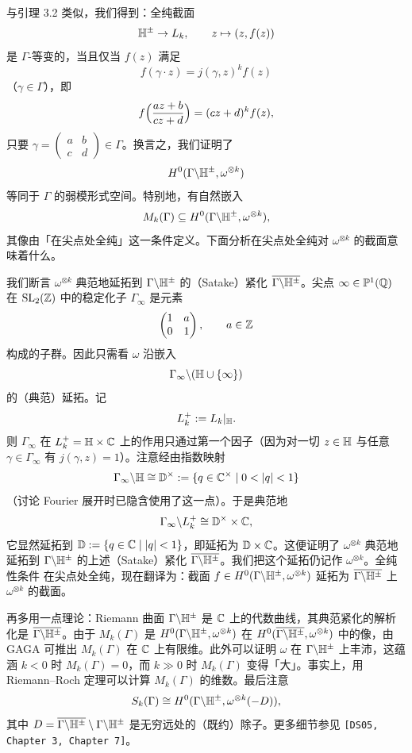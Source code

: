 与引理 3.2 类似，我们得到：全纯截面
\[
\mathbb{H}^\pm\to L_k,\qquad z\mapsto(z,f(z))
\]
是 $\Gamma$-等变的，当且仅当 $f(z)$ 满足
\[
f(\gamma\cdot z)=j(\gamma,z)^kf(z)
\]
（$\gamma\in\Gamma$），即
\[
f\Bigl(\frac{az+b}{cz+d}\Bigr)=(cz+d)^kf(z),
\]
只要 $\gamma=\begin{pmatrix}a&b\\c&d\end{pmatrix}\in\Gamma$。换言之，我们证明了
\[
H^0(\Gamma\backslash\mathbb{H}^\pm,\omega^{\otimes k})
\]
等同于 $\Gamma$ 的弱模形式空间。特别地，有自然嵌入
\[
M_k(\Gamma)\subseteq H^0(\Gamma\backslash\mathbb{H}^\pm,\omega^{\otimes k}),
\]
其像由「在尖点处全纯」这一条件定义。下面分析在尖点处全纯对 $\omega^{\otimes k}$ 的截面意味着什么。

我们断言 $\omega^{\otimes k}$ 典范地延拓到 $\Gamma\backslash\mathbb{H}^\pm$ 的（Satake）紧化 $\overline{\Gamma\backslash\mathbb{H}^\pm}$。尖点 $\infty\in\mathbb{P}^1(\mathbb{Q})$ 在 $\operatorname{SL}_2(\mathbb{Z})$ 中的稳定化子 $\Gamma_\infty$ 是元素
\[
\begin{pmatrix}1&a\\0&1\end{pmatrix},\qquad a\in\mathbb{Z}
\]
构成的子群。因此只需看 $\omega$ 沿嵌入
\[
\Gamma_\infty\backslash(\mathbb{H}\cup\{\infty\})
\]
的（典范）延拓。记
\[
L_k^+:=L_k|_{\mathbb{H}}.
\]
则 $\Gamma_\infty$ 在 $L_k^+=\mathbb{H}\times\mathbb{C}$ 上的作用只通过第一个因子（因为对一切 $z\in\mathbb{H}$ 与任意 $\gamma\in\Gamma_\infty$ 有 $j(\gamma,z)=1$）。注意经由指数映射
\[
\Gamma_\infty\backslash\HH\cong\mathbb{D}^\times:=\{q\in\C^\times\mid 0<|q|<1\}
\]
（讨论 Fourier 展开时已隐含使用了这一点）。于是典范地
\[
\Gamma_\infty\backslash L_k^+\cong\mathbb{D}^\times\times\mathbb{C},
\]
它显然延拓到 $\mathbb{D}:=\{q\in\mathbb{C}\mid|q|<1\}$，即延拓为 $\mathbb{D}\times\mathbb{C}$。这便证明了 $\omega^{\otimes k}$ 典范地延拓到 $\Gamma\backslash\mathbb{H}^\pm$ 的上述（Satake）紧化 $\overline{\Gamma\backslash\mathbb{H}^\pm}$。我们把这个延拓仍记作 $\omega^{\otimes k}$。全纯性条件
在尖点处全纯，现在翻译为：截面 $f\in H^0(\Gamma\backslash\mathbb{H}^\pm,\omega^{\otimes k})$ 延拓为 $\overline{\Gamma\backslash\mathbb{H}^\pm}$ 上 $\omega^{\otimes k}$ 的截面。

再多用一点理论：Riemann 曲面 $\Gamma\backslash\mathbb{H}^\pm$ 是 $\mathbb{C}$ 上的代数曲线，其典范紧化的解析化是 $\overline{\Gamma\backslash\mathbb{H}^\pm}$。由于 $M_k(\Gamma)$ 是 $H^0(\Gamma\backslash\mathbb{H}^\pm,\omega^{\otimes k})$ 在 $H^0(\overline{\Gamma\backslash\mathbb{H}^\pm},\omega^{\otimes k})$ 中的像，由 GAGA 可推出 $M_k(\Gamma)$ 在 $\mathbb{C}$ 上有限维。此外可以证明 $\omega$ 在 $\Gamma\backslash\mathbb{H}^\pm$ 上丰沛，这蕴涵 $k<0$ 时 $M_k(\Gamma)=0$，而 $k\gg0$ 时 $M_k(\Gamma)$ 变得「大」。事实上，用 Riemann--Roch 定理可以计算 $M_k(\Gamma)$ 的维数。最后注意
\[
S_k(\Gamma)\cong H^0(\Gamma\backslash\mathbb{H}^\pm,\omega^{\otimes k}(-D)),
\]
其中 $D=\overline{\Gamma\backslash\mathbb{H}^\pm}\setminus\Gamma\backslash\mathbb{H}^\pm$ 是无穷远处的（既约）除子。更多细节参见 \texttt{[DS05, Chapter 3, Chapter 7]}。


